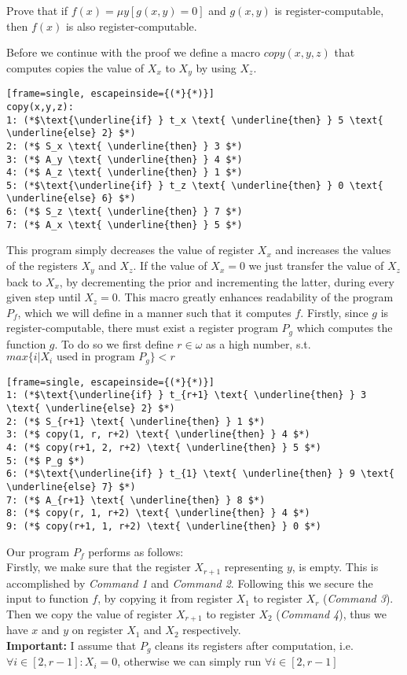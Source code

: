 \documentclass[11pt,a4paper]{article}
\begin{document}
Prove that if $f(x) = \mu y[g(x, y) = 0]$ and $g(x, y)$ is register-computable, then $f(x)$ is also register-computable.


Before we continue with the proof we define a macro $copy(x,y,z)$ that computes copies the value of $X_x$ to $X_y$ by using $X_z$.


\begin{lstlisting}[frame=single, escapeinside={(*}{*)}] 
copy(x,y,z):
1: (*$\text{\underline{if} } t_x \text{ \underline{then} } 5 \text{ \underline{else} 2} $*)
2: (*$ S_x \text{ \underline{then} } 3 $*)
3: (*$ A_y \text{ \underline{then} } 4 $*)
4: (*$ A_z \text{ \underline{then} } 1 $*)
5: (*$\text{\underline{if} } t_z \text{ \underline{then} } 0 \text{ \underline{else} 6} $*)
6: (*$ S_z \text{ \underline{then} } 7 $*)
7: (*$ A_x \text{ \underline{then} } 5 $*)
\end{lstlisting}

This program simply decreases the value of register $X_x$ and increases the values of the registers $X_y$ and $X_z$.
If the value of $X_x=0$ we just transfer the value of $X_z$ back to $X_x$, by decrementing the prior and incrementing the latter, during every given step until $X_z=0$.   
This macro greatly enhances readability of the program $P_f$, which we will define in a manner such that it computes $f$.
Firstly, since $g$ is register-computable, there must exist a register program $P_g$ which computes the function $g$.
To do so we first define $r \in \omega$ as a high number, s.t. $max\{ i | X_i \text{ used in program } P_g\} < r$

\begin{lstlisting}[frame=single, escapeinside={(*}{*)}] 
1: (*$\text{\underline{if} } t_{r+1} \text{ \underline{then} } 3 \text{ \underline{else} 2} $*)
2: (*$ S_{r+1} \text{ \underline{then} } 1 $*)
3: (*$ copy(1, r, r+2) \text{ \underline{then} } 4 $*)
4: (*$ copy(r+1, 2, r+2) \text{ \underline{then} } 5 $*)
5: (*$ P_g $*)
6: (*$\text{\underline{if} } t_{1} \text{ \underline{then} } 9 \text{ \underline{else} 7} $*)
7: (*$ A_{r+1} \text{ \underline{then} } 8 $*)
8: (*$ copy(r, 1, r+2) \text{ \underline{then} } 4 $*)
9: (*$ copy(r+1, 1, r+2) \text{ \underline{then} } 0 $*)
\end{lstlisting}

Our program $P_f$ performs as follows: \\
Firstly, we make sure that the register $X_{r+1}$ representing $y$, is empty. 
This is accomplished by \emph{Command 1} and \emph{Command 2}. 
Following this we  secure the input to function $f$, by copying it from register $X_1$ to register $X_r$ (\emph{Command 3}).
Then we copy the value of register $X_{r+1}$ to register $X_2$ (\emph{Command 4}), thus we have $x$ and $y$ on register $X_1$ and $X_2$ respectively. \\
\textbf{Important:} I assume that $P_g$ cleans its registers after computation, i.e. $\forall i \in [2,r-1]: X_i=0$, otherwise we can simply run $\forall i \in [2,r-1]$ 
\end{document}
